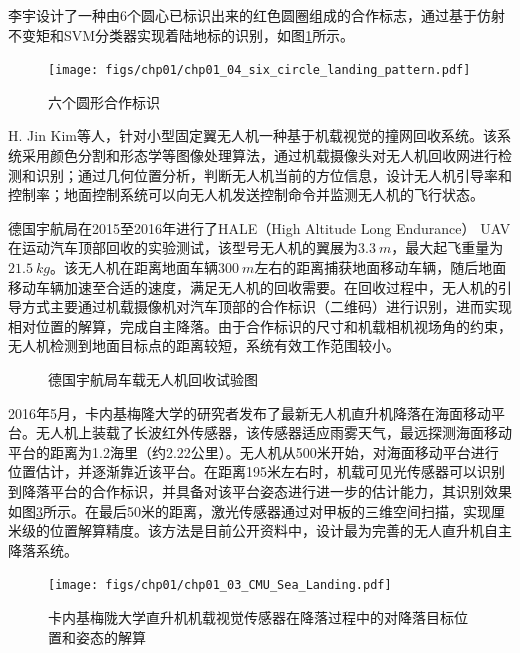 李宇\cite{Li_Master_2012}设计了一种由6个圆心已标识出来的红色圆圈组成的合作标志，通过基于仿射不变矩和SVM分类器实现着陆地标的识别，如图\ref{fig:chp01_04_six_circle_landing_pattern}所示。
\begin{figure}[!tb]   
	\centering	
	\texttt{[image: figs/chp01/chp01\_04\_six\_circle\_landing\_pattern.pdf]}
	\caption{六个圆形合作标识\cite{Li_Master_2012}}
	\label{fig:chp01_04_six_circle_landing_pattern}
\end{figure}

H. Jin Kim等人\cite{kim2013fully}，针对小型固定翼无人机一种基于机载视觉的撞网回收系统。该系统采用颜色分割和形态学等图像处理算法，通过机载摄像头对无人机回收网进行检测和识别；通过几何位置分析，判断无人机当前的方位信息，设计无人机引导率和控制率；地面控制系统可以向无人机发送控制命令并监测无人机的飞行状态。

德国宇航局在2015至2016年进行了HALE（High Altitude Long Endurance） UAV在运动汽车顶部回收的实验测试，该型号无人机的翼展为$3.3\ m$，最大起飞重量为$21.5\ kg$。该无人机在距离地面车辆$300\ m$左右的距离捕获地面移动车辆，随后地面移动车辆加速至合适的速度，满足无人机的回收需要。在回收过程中，无人机的引导方式主要通过机载摄像机对汽车顶部的合作标识（二维码）进行识别，进而实现相对位置的解算，完成自主降落\cite{Muskardin2016}。由于合作标识的尺寸和机载相机视场角的约束，无人机检测到地面目标点的距离较短，系统有效工作范围较小。
\begin{figure}[htb]
	\centering%
	\hspace{0em}%
	\caption{德国宇航局车载无人机回收试验图\cite{Muskardin2016}}
	\label{fig:07_ILS}
\end{figure}

2016年5月，卡内基梅隆大学的研究者发布了最新无人机直升机降落在海面移动平台\cite{Grocholsky2016}。无人机上装载了长波红外传感器，该传感器适应雨雾天气，最远探测海面移动平台的距离为1.2海里（约2.22公里）。无人机从500米开始，对海面移动平台进行位置估计，并逐渐靠近该平台。在距离195米左右时，机载可见光传感器可以识别到降落平台的合作标识，并具备对该平台姿态进行进一步的估计能力，其识别效果如图\ref{fig:chp01_03_CMU_Sea_Landing}所示。在最后50米的距离，激光传感器通过对甲板的三维空间扫描，实现厘米级的位置解算精度。该方法是目前公开资料中，设计最为完善的无人直升机自主降落系统。
\begin{figure}[htb]   
	\centering
	\texttt{[image: figs/chp01/chp01\_03\_CMU\_Sea\_Landing.pdf]}
	\caption{卡内基梅陇大学直升机机载视觉传感器在降落过程中的对降落目标位置和姿态的解算\cite{Grocholsky2016}}
	\label{fig:chp01_03_CMU_Sea_Landing}
\end{figure}

